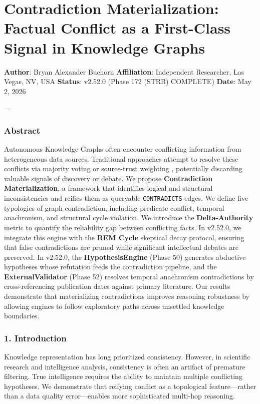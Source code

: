 \section{Contra\-diction Materi\-alization: Factual Conflict as a First-Class Signal in Knowledge Graphs}

\textbf{Author}: Bryan Alexander Buchorn  
\textbf{Affiliation}: Independent Researcher, Las Vegas, NV, USA  
\textbf{Status}: v2.52.0 (Phase 172 (STRB) COMPLETE)
\textbf{Date}: May 2, 2026

---

\subsubsection{Abstract}
Autonomous Knowledge Graphs often encounter conflicting information from heter\-ogeneous data sources. Traditional approaches attempt to resolve these conflicts via majority voting or source-trust weighting \cite{dong2014knowledgevault, bertossi2011database}, potentially discarding valuable signals of discovery or debate. We propose \textbf{Contra\-diction Materi\-alization}, a framework that identifies logical and structural incon\-sistencies and reifies them as queryable \texttt{CONTRADICTS} edges. We define five typologies of graph contr\-adiction, including predicate conflict, temporal anachronism, and structural cycle violation. We introduce the \textbf{Delta-Authority} metric to quantify the reliability gap between conflicting facts. In v2.52.0, we integrate this engine with the \textbf{REM Cycle} skeptical decay protocol, ensuring that false contr\-adictions are pruned while significant intel\-lectual debates are preserved. In v2.52.0, the \textbf{HypothesisEngine} (Phase 50) generates abductive hypotheses whose refutation feeds the contr\-adiction pipeline, and the \textbf{ExternalValidator} (Phase 52) resolves temporal anachronism contr\-adictions by cross-referencing publication dates against primary literature. Our results demonstrate that mater\-ializing contr\-adictions improves reasoning robustness by allowing engines to follow exploratory paths across unsettled knowledge boundaries.

\subsubsection{1. Introd\-uction}
Knowledge repre\-sentation has long prioritized consistency. However, in scientific research and intel\-ligence analysis, consistency is often an artifact of premature filtering. True intel\-ligence requires the ability to maintain multiple conflicting hypotheses. We demonstrate that reifying conflict as a topological feature—rather than a data quality error—enables more sophi\-sticated multi-hop reasoning.

